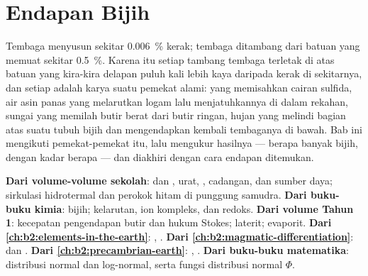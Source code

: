 \chapter{Endapan Bijih}\label{ch:b2:ore-deposits}

Tembaga menyusun sekitar \qty{0.006}{\percent} kerak; tembaga ditambang dari batuan yang memuat sekitar
\qty{0.5}{\percent}. Karena itu setiap tambang tembaga terletak di atas batuan yang kira-kira delapan puluh kali lebih kaya daripada
kerak di sekitarnya, dan setiap  adalah karya suatu pemekat alami:  yang
memisahkan cairan sulfida, air asin panas yang melarutkan logam lalu menjatuhkannya di dalam rekahan, sungai
yang memilah butir berat dari butir ringan, hujan yang melindi bagian atas suatu tubuh bijih dan
mengendapkan kembali tembaganya di bawah. Bab ini mengikuti pemekat-pemekat itu, lalu mengukur
hasilnya --- berapa banyak bijih, dengan kadar berapa --- dan diakhiri dengan cara endapan ditemukan.

\begin{recall}
\textbf{Dari volume-volume sekolah}:  dan , urat, , cadangan, dan
sumber daya; sirkulasi hidrotermal dan perokok hitam di punggung samudra. \textbf{Dari buku-buku
kimia}: bijih; kelarutan, ion kompleks, dan redoks. \textbf{Dari volume Tahun 1}: kecepatan
pengendapan butir dan hukum Stokes; laterit; evaporit. \textbf{Dari
\cref{ch:b2:elements-in-the-earth}}: , .
\textbf{Dari \cref{ch:b2:magmatic-differentiation}}:  dan
. \textbf{Dari \cref{ch:b2:precambrian-earth}}: , .
\textbf{Dari buku-buku matematika}: distribusi normal dan log-normal, serta fungsi
distribusi normal $\Phi$.
\end{recall}

